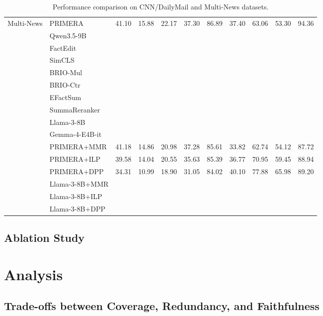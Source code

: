 \documentclass[11pt]{article}
\begin{document}
\begin{table}[htbp]
{\begin{tabular}{@{} l l cccc c cccc @{}}
\midrule

\multirow{16}{*}{Multi-News}
 & PRIMERA            & 41.10 & 15.88 & 22.17 & 37.30 & 86.89 & 37.40 & 63.06 & 53.30 & 94.36 \\
 & Qwen3.5-9B        &  &  &  &  &  &  &  &  &  \\
 & FactEdit        &  &  &  &  &  &  &  &  &  \\
 & SimCLS          &  &  &  &  &  &  &  &  &  \\
 & BRIO-Mul        &  &  &  &  &  &  &  &  &  \\
 & BRIO-Ctr        &  &  &  &  &  &  &  &  &  \\
 & EFactSum        &  &  &  &  &  &  &  &  &  \\
 & SummaReranker   &  &  &  &  &  &  &  &  &  \\
 & Llama-3-8B      &  &  &  &  &  &  &  &  &  \\
 & Gemma-4-E4B-it   &  &  &  &  &  &  &  &  &  \\
 \cmidrule(l){2-11}
 & PRIMERA+MMR        & 41.18 & 14.86 & 20.98 & 37.28 & 85.61 & 33.82 & 62.74 & 54.12 & 87.72 \\
 & PRIMERA+ILP        & 39.58 & 14.04 & 20.55 & 35.63 & 85.39 & 36.77 & 70.95 & 59.45 & 88.94 \\
 & PRIMERA+DPP        & 34.31 & 10.99 & 18.90 & 31.05 & 84.02 & 40.10 & 77.88 & 65.98 & 89.20 \\
 &Llama-3-8B+MMR          &  &  &  &  &  &  &  &  &  \\
 & Llama-3-8B+ILP          &  &  &  &  &  &  &  &  &  \\
 & Llama-3-8B+DPP          &  &  &  &  &  &  &  &  &  \\

\bottomrule
\end{tabular}%
}
\caption{Performance comparison on CNN/DailyMail and Multi-News datasets.}
\label{tab:main_results}
\end{table}
\subsection{Ablation Study}

\section{Analysis}
\subsection{Trade-offs between Coverage, Redundancy, and Faithfulness}
\end{document}
